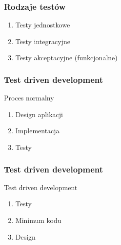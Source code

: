 \documentclass[slidestop,compress,mathserif]{beamer}
\begin{document}
\begin{frame}
\frametitle{Rodzaje testów}
 \begin{enumerate}
  \item Testy jednostkowe
  \pause \item Testy integracyjne
  \pause \item Testy akceptacyjne (funkcjonalne)
\end{enumerate}
\end{frame}


\begin{frame}
\frametitle{Test driven development}
Proces normalny
 \begin{enumerate}
  \item Design aplikacji
  \pause \item Implementacja
  \pause \item Testy 
\end{enumerate}
\end{frame}

\begin{frame}
\frametitle{Test driven development}
Test driven development
 \begin{enumerate}
  \item Testy
  \pause \item Minimum kodu
  \pause \item Design %
\end{enumerate}
\end{frame}
\end{document}
